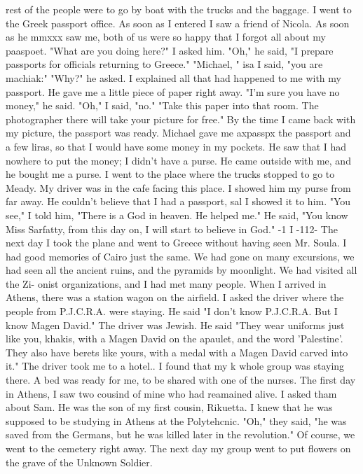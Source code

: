 rest of the people were to go by boat with the trucks and the baggage. I went to the 
Greek passport office. As soon as I entered I saw a friend of Nicola. As soon as he mmxxx 
saw me, both of us were so happy that I forgot all about my paaspoet. 
"What are you doing here?" I asked him. 
"Oh," he said, "I prepare passports for officials returning to Greece." 
"Michael, " isa I said, "you are machiak:" 
"Why?" he asked. I explained all that had happened to me with my passport. He 
gave me a little piece of paper right away. 
"I'm sure you have no money," he said. 
"Oh," I said, "no." 
"Take this paper into that room. The photographer there will take your picture 
for free." By the time I came back with my picture, the passport was ready. Michael 
gave me axpasspx the passport and a few liras, so that I would have some money in my 
pockets. He saw that I had nowhere to put the money; I didn't have a purse. He came 
outside with me, and he bought me a purse. 
I went to the place where the trucks stopped to go to Meady. My driver was in the 
cafe facing this place. I showed him my purse from far away. He couldn't believe that 
I had a passport, sal I showed it to him. "You see," I told him, "There is a God in 
heaven. He helped me." He said, "You know Miss Sarfatty, from this day on, I will 
start to believe in God." 
-1 I 
-112- 
The next day I took the plane and went to Greece without having seen Mr. Soula. 
I had good memories of Cairo just the same. We had gone on many excursions, we had 
seen all the ancient ruins, and the pyramids by moonlight. We had visited all the Zi-
onist organizations, and I had met many people. 
When I arrived in Athens, there was a station wagon on the airfield. I asked the 
driver where the people from P.J.C.R.A. were staying. He said "I don't know P.J.C.R.A. 
But I know Magen David." The driver was Jewish. He said "They wear uniforms just like 
you, khakis, with a Magen David on the apaulet, and the word 'Palestine'. They also 
have berets like yours, with a medal with a Magen David carved into it." The driver 
took me to a hotel.. I found that my k whole group was staying there. A bed was ready 
for me, to be shared with one of the nurses. 
The first day in Athens, I saw two cousind of mine who had reamained alive. I 
asked tham about Sam. He was the son of my first cousin, Rikuetta. I knew that he 
was supposed to be studying in Athens at the Polytehcnic. "Oh," they said, "he was 
saved from the Germans, but he was killed later in the revolution." Of course, we 
went to the cemetery right away. 
The next day my group went to put flowers on the grave of the Unknown Soldier. 
